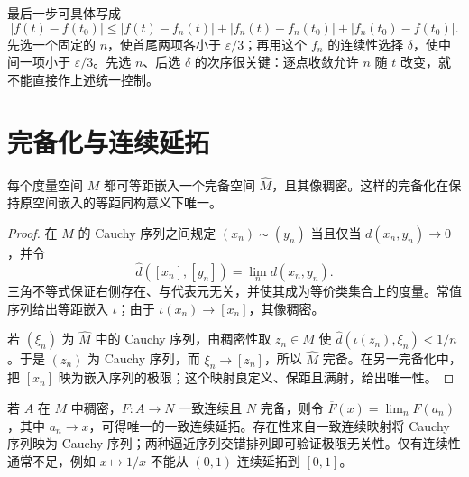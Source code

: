 \documentclass[UTF8,12pt,a4paper,fontset=fandol]{ctexbook}
\begin{document}
最后一步可具体写成
\[
 |f(t)-f(t_0)|\leq |f(t)-f_n(t)|
 +|f_n(t)-f_n(t_0)|+|f_n(t_0)-f(t_0)|.
\]
先选一个固定的 $n$，使首尾两项各小于 $\varepsilon/3$；再用这个 $f_n$ 的连续性选择 $\delta$，使中间一项小于 $\varepsilon/3$。先选 $n$、后选 $\delta$ 的次序很关键：逐点收敛允许 $n$ 随 $t$ 改变，就不能直接作上述统一控制。

\section{完备化与连续延拓}
\begin{theorem}[完备化]
每个度量空间 $M$ 都可等距嵌入一个完备空间 $\widehat M$，且其像稠密。这样的完备化在保持原空间嵌入的等距同构意义下唯一。
\end{theorem}
\begin{proof}
在 $M$ 的 Cauchy 序列之间规定 $(x_n)\sim(y_n)$ 当且仅当 $d(x_n,y_n)\to0$，并令
\[
 \widehat d([x_n],[y_n])=\lim_n d(x_n,y_n).
\]
三角不等式保证右侧存在、与代表元无关，并使其成为等价类集合上的度量。常值序列给出等距嵌入 $\iota$；由于 $\iota(x_n)\to[x_n]$，其像稠密。

若 $(\xi_n)$ 为 $\widehat M$ 中的 Cauchy 序列，由稠密性取 $z_n\in M$ 使 $\widehat d(\iota(z_n),\xi_n)<1/n$。于是 $(z_n)$ 为 Cauchy 序列，而 $\xi_n\to[z_n]$，所以 $\widehat M$ 完备。在另一完备化中，把 $[x_n]$ 映为嵌入序列的极限；这个映射良定义、保距且满射，给出唯一性。
\end{proof}

若 $A$ 在 $M$ 中稠密，$F:A\to N$ 一致连续且 $N$ 完备，则令 $\overline F(x)=\lim_nF(a_n)$，其中 $a_n\to x$，可得唯一的一致连续延拓。存在性来自一致连续映射将 Cauchy 序列映为 Cauchy 序列；两种逼近序列交错排列即可验证极限无关性。仅有连续性通常不足，例如 $x\mapsto1/x$ 不能从 $(0,1)$ 连续延拓到 $[0,1]$。
\end{document}
